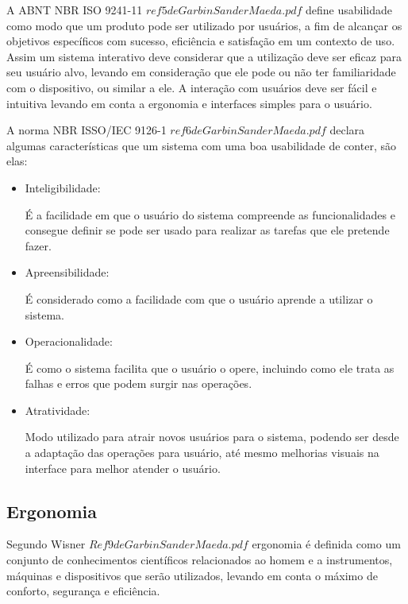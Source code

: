 \documentclass[
	12pt,			%
	openright,		%
	oneside,			%
	a4paper,			%
	chapter=TITLE,		%
	english,			%
	brazil,			%
	]{abntex2}
\begin{document}
A ABNT NBR ISO 9241-11 \(ref 5 de Garbin Sander Maeda.pdf\) define usabilidade como modo que um produto pode ser utilizado por usuários, a fim de alcançar os objetivos específicos com sucesso, eficiência e satisfação em um contexto de uso. Assim um sistema interativo deve considerar que a utilização deve ser eficaz para seu usuário alvo, levando em consideração que ele pode ou não ter familiaridade com o dispositivo, ou similar a ele. A interação com usuários deve ser fácil e intuitiva levando em conta a ergonomia e interfaces simples para o usuário.

A norma NBR ISSO/IEC 9126-1 \(ref 6 de Garbin Sander Maeda.pdf\) declara algumas características que um sistema com uma boa usabilidade de conter, são elas:

\begin{itemize}
	\item Inteligibilidade:

É a facilidade em que o usuário do sistema compreende as funcionalidades e consegue definir se pode ser usado para realizar as tarefas que ele pretende fazer.

\item Apreensibilidade:

É considerado como a facilidade com que o usuário aprende a utilizar o sistema.

\item Operacionalidade:

É como o sistema facilita que o usuário o opere, incluindo como ele trata as falhas e erros que podem surgir nas operações.

\item Atratividade:

Modo utilizado para atrair novos usuários para o sistema, podendo ser desde a adaptação das operações para usuário, até mesmo melhorias visuais na interface para melhor atender o usuário.

\end{itemize}

\subsection{Ergonomia}

Segundo Wisner \(Ref 9 de Garbin Sander Maeda.pdf\) ergonomia é definida como um conjunto de conhecimentos científicos relacionados ao homem e a instrumentos, máquinas e dispositivos que serão utilizados, levando em conta o máximo de conforto, segurança e eficiência.
\end{document}
